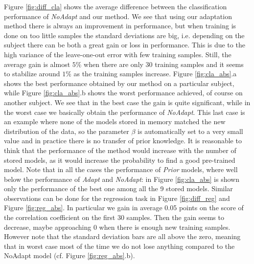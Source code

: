 Figure \ref{fig:diff_cla} shows the average difference between 
the classification performance of \emph{NoAdapt} and our method. We see that using our adaptation
method there is always an improvement in performance, but when training is done on too little samples %
the standard deviations are big, i.e. depending on the subject there can be both a great gain or loss in performance. 
This is due to the high variance of the
leave-one-out error with few training samples. Still, the average gain is
almost $5\%$ when there are only 30 training samples and it seems to stabilize
around $1\%$ as the training samples increase.
Figure \ref{fig:cla_abs}.a shows the best performance obtained by our method
on a particular subject, while  Figure \ref{fig:cla_abs}.b shows the worst
performance achieved, of course on another subject. We see that in the best case the gain is quite significant,
while in the worst case we basically obtain  the performance of \emph{NoAdapt}. This last case is an example
where none of the models stored in memory matched the new distribution of the data, so the parameter
$\beta$ is automatically set to a very small value and in practice there is no transfer of prior knowledge. It is reasonable to think
that the performance of the method would increase with the number of stored
models, as it would increase the probability to find a good pre-trained model.
Note that in all the cases the performance of \emph{Prior} models, where well
below the performance of \emph{Adapt} and \emph{NoAdapt}: in Figure \ref{fig:cla_abs} is shown
only the performance of the best one among all the 9 stored models.
Similar observations can be done for the regression task in Figure \ref{fig:diff_reg}
and Figure \ref{fig:reg_abs}. In particular we gain in average 0.05 points on the score
of the correlation coefficient on the first 30 samples. Then the gain seems to decrease,
maybe approaching 0 when there is enough new training samples. However note that
the standard deviation bars are all above the zero, meaning that in worst case most of the time
we do not lose anything compared to the NoAdapt model (cf. Figure \ref{fig:reg_abs}.b).

